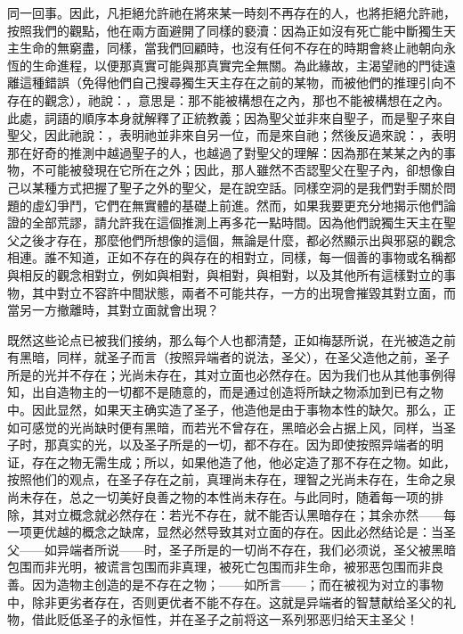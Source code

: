 同一回事。因此，凡拒絕允許祂在將來某一時刻不再存在的人，也將拒絕允許祂，按照我們的觀點，他在兩方面避開了同樣的褻瀆：因為正如沒有死亡能中斷獨生天主生命的無窮盡，同樣，當我們回顧時，也沒有任何不存在的時期會終止祂朝向永恆的生命進程，以便那真實可能與那真實完全無關。為此緣故，主渴望祂的門徒遠離這種錯誤（免得他們自己搜尋獨生天主存在之前的某物，而被他們的推理引向不存在的觀念），祂說：，意思是：那不能被構想在之內，那也不能被構想在之內。此處，詞語的順序本身就解釋了正統教義；因為聖父並非來自聖子，而是聖子來自聖父，因此祂說：，表明祂並非來自另一位，而是來自祂；然後反過來說：，表明那在好奇的推測中越過聖子的人，也越過了對聖父的理解：因為那在某某之內的事物，不可能被發現在它所在之外；因此，那人雖然不否認聖父在聖子內，卻想像自己以某種方式把握了聖子之外的聖父，是在說空話。同樣空洞的是我們對手關於問題的虛幻爭鬥，它們在無實體的基礎上前進。然而，如果我要更充分地揭示他們論證的全部荒謬，請允許我在這個推測上再多花一點時間。因為他們說獨生天主在聖父之後才存在，那麼他們所想像的這個，無論是什麼，都必然顯示出與邪惡的觀念相連。誰不知道，正如不存在的與存在的相對立，同樣，每一個善的事物或名稱都與相反的觀念相對立，例如與相對，與相對，與相對，以及其他所有這樣對立的事物，其中對立不容許中間狀態，兩者不可能共存，一方的出現會摧毀其對立面，而當另一方撤離時，其對立面就會出現？\par

既然这些论点已被我们接纳，那么每个人也都清楚，正如梅瑟所说，在光被造之前有黑暗，同样，就圣子而言（按照异端者的说法，圣父），在圣父造他之前，圣子所是的光并不存在；光尚未存在，其对立面也必然存在。因为我们也从其他事例得知，出自造物主的一切都不是随意的，而是通过创造将所缺之物添加到已有之物中。因此显然，如果天主确实造了圣子，他造他是由于事物本性的缺欠。那么，正如可感觉的光尚缺时便有黑暗，而若光不曾存在，黑暗必会占据上风，同样，当圣子时，那真实的光，以及圣子所是的一切，都不存在。因为即使按照异端者的明证，存在之物无需生成；所以，如果他造了他，他必定造了那不存在之物。如此，按照他们的观点，在圣子存在之前，真理尚未存在，理智之光尚未存在，生命之泉尚未存在，总之一切美好良善之物的本性尚未存在。与此同时，随着每一项的排除，其对立概念就必然存在：若光不存在，就不能否认黑暗存在；其余亦然——每一项更优越的概念之缺席，显然必然导致其对立面的存在。因此必然结论是：当圣父——如异端者所说——时，圣子所是的一切尚不存在，我们必须说，圣父被黑暗包围而非光明，被谎言包围而非真理，被死亡包围而非生命，被邪恶包围而非良善。因为造物主创造的是不存在之物；——如所言——；而在被视为对立的事物中，除非更劣者存在，否则更优者不能不存在。这就是异端者的智慧献给圣父的礼物，借此贬低圣子的永恒性，并在圣子之前将这一系列邪恶归给天主圣父！\par

